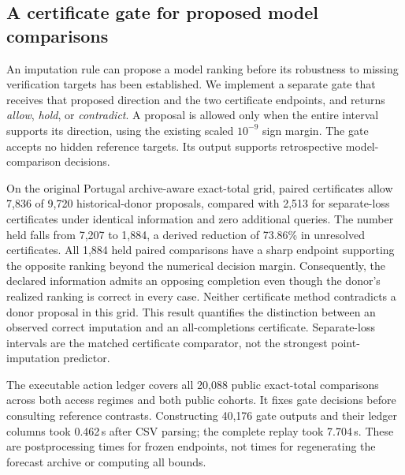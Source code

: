\subsection{A certificate gate for proposed model comparisons}
\label{sec:practical_gate}
An imputation rule can propose a model ranking before its robustness to
missing verification targets has been established. We implement a separate
gate that receives that proposed direction and the two certificate endpoints,
and returns \emph{allow}, \emph{hold}, or \emph{contradict}. A proposal is allowed
only when the entire interval supports its direction, using the existing
scaled $10^{-9}$ sign margin. The gate accepts no hidden reference targets.
Its output supports retrospective model-comparison decisions.

On the original Portugal archive-aware exact-total grid, paired certificates
allow 7,836 of 9,720 historical-donor proposals, compared with 2,513 for
separate-loss certificates under identical information and zero additional
queries. The number held falls from 7,207 to 1,884, a derived reduction of
73.86\% in unresolved certificates. All 1,884 held paired comparisons have a
sharp endpoint supporting the opposite ranking beyond the numerical decision
margin. Consequently, the declared information admits an opposing completion
even though the donor's realized ranking is correct in every case. Neither
certificate method contradicts a donor proposal in this grid. This result
quantifies the distinction between an observed correct imputation and an
all-completions certificate. Separate-loss intervals are the matched
certificate comparator, not the strongest point-imputation predictor.

The executable action ledger covers all 20,088 public exact-total comparisons
across both access regimes and both public cohorts. It fixes gate decisions
before consulting reference contrasts. Constructing 40,176 gate outputs and
their ledger columns took 0.462\,s after CSV parsing; the complete replay took
7.704\,s. These are postprocessing times for frozen endpoints, not times for
regenerating the forecast archive or computing all bounds.

